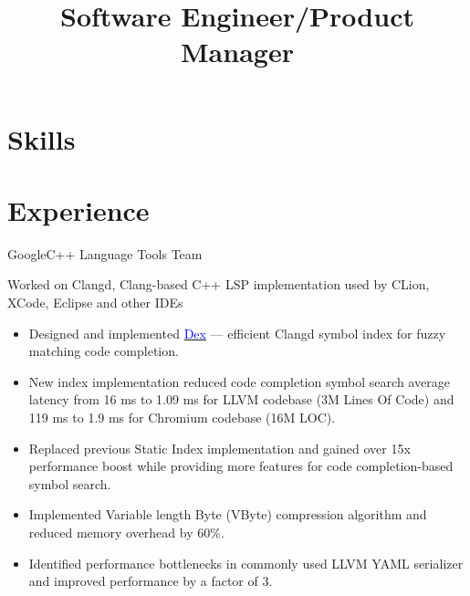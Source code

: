 \documentclass[10pt,a4paper,sans]{moderncv}
\title{Software Engineer/Product Manager}
\begin{document}
\makecvtitle

\section{Skills}

\section{Experience}
    {Google}{}{C++ Language Tools Team}
    {Worked on Clangd, Clang-based C++ LSP implementation used by CLion, XCode,
     Eclipse and other IDEs
     \begin{itemize}
       \item Designed and implemented
         \href{https://docs.google.com/document/d/1C-A6PGT6TynyaX4PXyExNMiGmJ2jL1UwV91Kyx11gOI/edit?usp=sharing}
         {\textcolor{blue}{Dex}} --- efficient Clangd symbol index for fuzzy
         matching code completion.
       \item New index implementation reduced code completion symbol search
         average latency from 16 ms to 1.09 ms for LLVM codebase (3M Lines Of
         Code) and 119 ms to 1.9 ms for Chromium codebase (16M LOC).
       \item Replaced previous Static Index implementation and gained over
         15x performance boost while providing more features for code
         completion-based symbol search.
       \item Implemented Variable length Byte (VByte) compression algorithm and
         reduced memory overhead by 60\%.
       \item Identified performance bottlenecks in commonly used LLVM YAML
         serializer and improved performance by a factor of 3.
     \end{itemize}}
\end{document}
